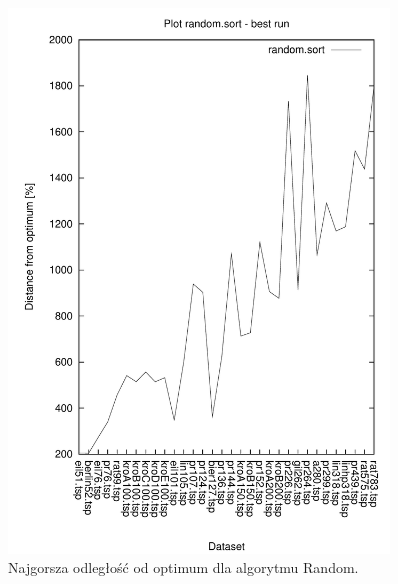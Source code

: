 \begin{figure}
\begin{center}
\includegraphics[width=0.9\textwidth]{wykresy/random_sort_worst}
\end{center}
\caption{Najgorsza odległość od optimum dla algorytmu Random.}
\label{random_sort_worst}
\end{figure}



